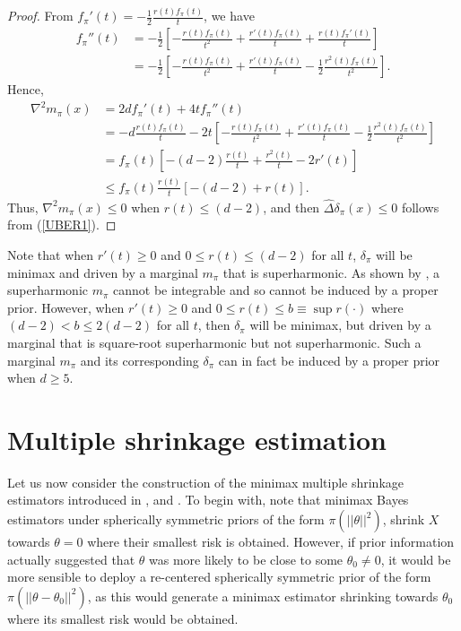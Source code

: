 \documentclass[11pt]{article}
\theoremstyle{definition}
\begin{document}
 \begin{proof}
     From $f_{\pi}'(t) = -\frac{1}{2}\frac{r(t) f_{\pi}(t)}{t}$, we have 
     \begin{align}
        \nonumber  f_{\pi}''(t) &  = -\frac{1}{2}\left[-\frac{r(t) f_{\pi}(t)}{t^2} + \frac{r'(t) f_{\pi}(t)}{t} + \frac{r(t) f_{\pi}'(t)}{t}\right] \\
      \nonumber  & =  -\frac{1}{2}\left[-\frac{r(t)f_{\pi}(t)}{t^2} + \frac{r'(t) f_{\pi}(t)}{t}  - \frac{1}{2}\frac{r^2(t) f_{\pi}(t)}{t^2}\right].
     \end{align}
Hence, 
\begin{align}
    \nonumber \nabla^2 m_{\pi}(x) & =  2 d f_{\pi}'(t) + 4 t f_{\pi}''(t) \\
    \nonumber & = -d\frac{r(t) f_{\pi}(t)}{t} - 2t\left[-\frac{r(t) f_{\pi}(t)}{t^2} + \frac{r'(t) f_{\pi}(t)}{t}  - \frac{1}{2}\frac{r^2(t) f_{\pi}(t)}{t^2}\right] \\
    \nonumber & = f_{\pi}(t) \left[ -(d - 2)\frac{r(t)}{t} + \frac{r^2(t)}{t} - 2r'(t) \right] \\
    \nonumber & \leq f_{\pi}(t) \frac{r(t)}{t}\left[ -(d - 2) + r(t) \right]. 
\end{align}
Thus, $\nabla^2 m_{\pi}(x) \leq 0$ when $r(t) \leq (d - 2)$, and then
$\hat{\Delta}\delta_\pi(x) \leq 0$ follows from (\ref{UBER1}). 
 \end{proof}


Note that when $r'(t) \ge 0$ and $0 \leq r(t) \leq (d-2)$ for all $t$, $\delta_\pi$ will be minimax and driven by a marginal $m_{\pi}$ that is superharmonic. As shown by \cite{FSW1998}, a superharmonic $m_{\pi}$ cannot be integrable and so cannot be induced by a proper prior. However, when $r'(t) \ge 0$ and $0 \leq r(t) \leq b \equiv \sup r(\cdot)$ where $(d-2) < b \le 2(d-2)$ for all $t$, then $\delta_\pi$ will be minimax, but driven by a marginal that is square-root superharmonic but not superharmonic. Such a marginal $m_{\pi}$ and its corresponding $\delta_\pi$ can in fact be induced by a proper prior when $d \geq 5$.



\section{Multiple shrinkage estimation}
\label{Multiple shrinkage pseudo-Bayes estimator} 
    Let us now consider the construction of the minimax multiple shrinkage estimators introduced in \cite{george1986a}, \cite{george1986c} and \cite{george1986b}.  To begin with, note that minimax Bayes estimators under spherically symmetric priors of the form $\pi(||\theta||^2)$,  shrink $X$ towards $\theta = 0$ where their smallest risk is obtained.  However, if prior information actually suggested that $\theta$ was more likely to be close to some $\theta_0 \ne 0$, it would be more sensible to deploy a re-centered spherically symmetric prior of the form $\pi(||\theta - \theta_0||^2)$, as this would generate a minimax estimator shrinking towards $\theta_0$ where its smallest risk would be obtained.  
\end{document}
